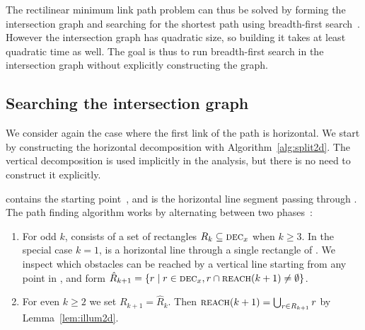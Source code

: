 \documentclass[english,gradu]{tktltiki2018}
\begin{document}
The rectilinear minimum link path problem can thus be solved by forming the intersection graph and searching for the shortest path using breadth-first search~\cite{dasnar}.
However the intersection graph has quadratic size, so building it takes at least quadratic time as well.
The goal is thus to run breadth-first search in the intersection graph without explicitly constructing the graph.

\subsection{Searching the intersection graph}

We consider again the case where the first link of the path is horizontal.
We start by constructing the horizontal decomposition with Algorithm~\ref{alg:split2d}.
The vertical decomposition is used implicitly in the analysis, but there is no need to construct it explicitly.

 contains the starting point~\spt, and  is the horizontal line segment passing through \spt.
The path finding algorithm works by alternating between two phases~\cite{revisited}:

\begin{enumerate}
\item For odd $k$,  consists of a set of rectangles $R_k\subseteq\textsc{dec}_{x}$ when $k\ge 3$.
	In the special case $k=1$,  is a horizontal line through a single rectangle of .
	We inspect which obstacles can be reached by a vertical line starting from any point in , and form $\hat{R}_{k+1}=\left\{r \mid r\in\textsc{dec}_{x}, r\cap\textsc{reach}(k+1)\neq\emptyset\right\}$.
\item For even $k\ge 2$ we set $R_{k+1}=\hat{R}_k$.
	Then $\textsc{reach}(k+1)=\bigcup_{r\in R_{k+1}}r$ by Lemma~\ref{lem:illum2d}.
\end{enumerate}
\end{document}
